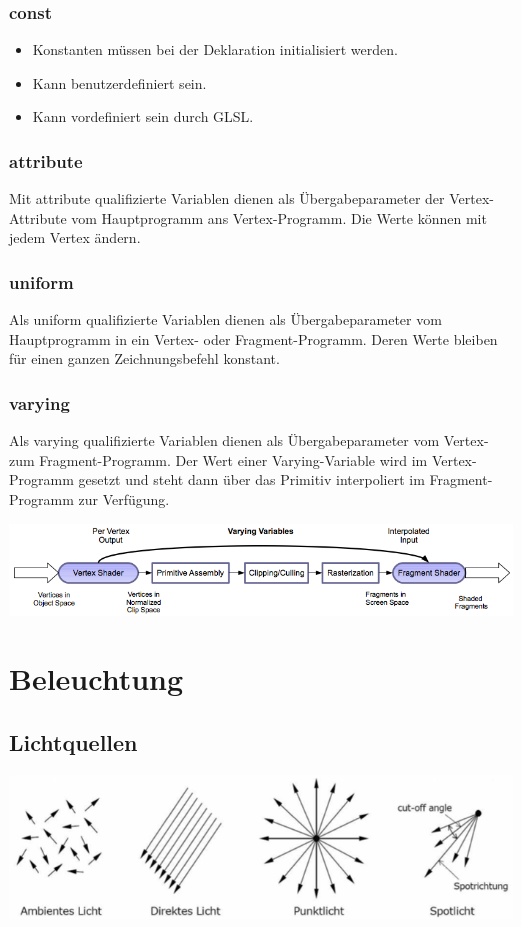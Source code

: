 \documentclass[10pt]{article}
\begin{document}
\subsubsection{const}
\begin{itemize}
	\item Konstanten müssen bei der Deklaration initialisiert werden.
	\item Kann benutzerdefiniert sein.
	\item Kann vordefiniert sein durch GLSL.
\end{itemize}
\subsubsection{attribute}
Mit attribute qualifizierte Variablen dienen als Übergabeparameter der Vertex-Attribute vom Hauptprogramm ans Vertex-Programm. Die Werte können mit jedem Vertex ändern.
\subsubsection{uniform}
Als uniform qualifizierte Variablen dienen als Übergabeparameter vom Hauptprogramm in ein Vertex- oder Fragment-Programm. Deren Werte bleiben für einen ganzen Zeichnungsbefehl konstant.
\subsubsection{varying}
Als varying qualifizierte Variablen dienen als Übergabeparameter vom Vertex- zum Fragment-Programm. Der Wert einer Varying-Variable wird im Vertex-Programm gesetzt und steht dann über das Primitiv interpoliert im Fragment-Programm zur Verfügung.
\begin{center}
	\includegraphics[scale=0.5]{glsl_varying.png}
\end{center}

\newpage
\section{Beleuchtung}
\subsection{Lichtquellen}
\begin{center}
	\includegraphics[scale=0.5]{lichtquellen.png}
\end{center}
\end{document}
